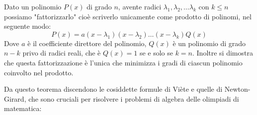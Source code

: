 \documentclass[11pt]{scrartcl}
\begin{document}
	\begin{theorem}
		Dato un polinomio $P(x)$ di grado $n$, avente radici $\lambda_1,\lambda_2,\dots\lambda_k$ con $k\le n$ possiamo "fattorizzarlo" cioè scriverlo unicamente come prodotto di polinomi, nel seguente modo:
		$$P(x)=a(x-\lambda_1)(x-\lambda_2)\dots(x-\lambda_k)Q(x)$$
		Dove $a$ è il coefficiente direttore del polinomio, $Q(x)$ è un polinomio di grado $n-k$ privo di radici reali, che è $Q(x)=1$ se e solo se $k=n$.
		Inoltre si dimostra che questa fattorizzazione è l'unica che minimizza i gradi di ciascun polinomio coinvolto nel prodotto.
	\end{theorem}
	Da questo teorema discendono le cosiddette formule di Viète e quelle di Newton-Girard, che sono cruciali per risolvere i problemi di algebra delle olimpiadi di matematica:
	
\end{document}
